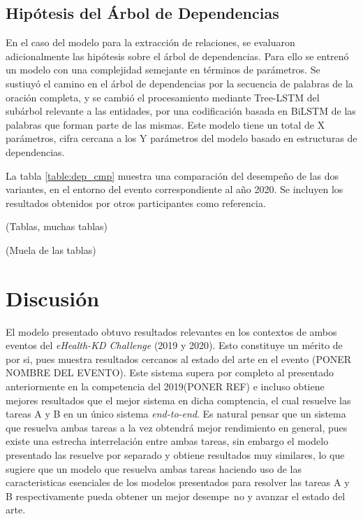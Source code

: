 \subsection{Hipótesis del Árbol de Dependencias}

En el caso del modelo para la extracción de relaciones, se evaluaron adicionalmente las hipótesis sobre el árbol de dependencias.
Para ello se entrenó un modelo con una complejidad semejante en términos de parámetros.
Se sustiuyó el camino en el árbol de dependencias por la secuencia de palabras de la oración completa, y se cambió el procesamiento mediante Tree-LSTM del subárbol relevante a las entidades, por una codificación basada en BiLSTM de las palabras que forman parte de las mismas.
Este modelo tiene un total de X parámetros, cifra cercana a los Y parámetros del modelo basado en estructuras de dependencias.

La tabla \ref{table:dep_cmp} muestra una comparación del desempeño de las dos variantes, en el entorno del evento correspondiente al año 2020. Se incluyen los resultados obtenidos por otros participantes como referencia.

(Tablas, muchas tablas)

(Muela de las tablas)


\section{Discusión}
El modelo presentado obtuvo resultados relevantes en los contextos de ambos eventos del \emph{eHealth-KD Challenge} (2019 y 2020). Esto constituye un m\'erito de por si, pues muestra resultados cercanos al estado del arte en el evento (PONER NOMBRE DEL EVENTO). Este sistema supera por completo al presentado anteriormente en la competencia del 2019(PONER REF) e incluso obtiene mejores resultados que el mejor sistema en dicha comptencia, el cual resuelve las tareas A y B en un \'unico sistema \emph{end-to-end}. Es natural pensar que un sistema que resuelva ambas tareas a la vez obtendr\'a mejor rendimiento en general, pues existe una estrecha interrelaci\'on entre ambas tareas, sin embargo el modelo presentado las resuelve por separado y obtiene resultados muy similares, lo que sugiere que un modelo que resuelva ambas tareas haciendo uso de las caracteristicas esenciales de los modelos presentados para resolver las tareas A y B respectivamente pueda obtener un mejor desempe~no y avanzar el estado del arte.

